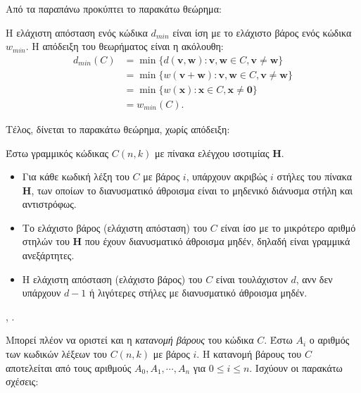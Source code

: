 Από τα παραπάνω προκύπτει το παρακάτω θεώρημα:

\begin{theorem}
Η ελάχιστη απόσταση ενός κώδικα $d_{min}$ είναι ίση με το ελάχιστο βάρος ενός κώδικα $w_{min}$. Η απόδειξη του θεωρήματος είναι η ακόλουθη:
\begin{equation}
\begin{split}
d_{min}(C) & = \min \lbrace d \left( \mathbf{v},\mathbf{w} \right) : \mathbf{v},\mathbf{w} \in C, \mathbf{v}\neq\mathbf{w} \rbrace \\
& = \min \lbrace w \left( \mathbf{v}+\mathbf{w} \right) : \mathbf{v},\mathbf{w} \in C, \mathbf{v}\neq\mathbf{w} \rbrace \\
& = \min \lbrace w \left( \mathbf{x} \right) : \mathbf{x} \in C, \mathbf{x}\neq\mathbf{0} \rbrace \\
& = w_{min}(C).
\end{split}
\end{equation}
\label{theorem:min distance}
\end{theorem}

Τέλος, δίνεται το παρακάτω θεώρημα, χωρίς απόδειξη:

\begin{theorem}
Έστω γραμμικός  κώδικας $C(n,k)$ με πίνακα ελέγχου ισοτιμίας $\mathbf{H}$.
\begin{itemize}
\item Για κάθε κωδική λέξη του $C$ με βάρος $i$, υπάρχουν ακριβώς $i$ στήλες του πίνακα $\mathbf{H}$, των οποίων το διανυσματικό άθροισμα είναι το μηδενικό διάνυσμα στήλη και αντιστρόφως.
\item Το ελάχιστο βάρος (ελάχιστη απόσταση) του $C$ είναι ίσο με το μικρότερο αριθμό στηλών του $\mathbf{H}$ που έχουν διανυσματικό άθροισμα μηδέν, δηλαδή είναι γραμμικά ανεξάρτητες.
\item Η ελάχιστη απόσταση (ελάχιστο βάρος) του $C$ είναι τουλάχιστον $d$, ανν δεν υπάρχουν $d-1$ ή λιγότερες στήλες με διανυσματικό άθροισμα μηδέν.
\end{itemize}
\label{theorem:distance weight parity check matrix}
\end{theorem}
\cite{ryan2009channel}, \cite{peterson1972error}.

\vspace{3mm}
Μπορεί πλέον να οριστεί και η \textit{κατανομή βάρους} του κώδικα $C$. Έστω $A_i$ ο αριθμός των κωδικών λέξεων του $C(n,k)$ με βάρος  $i$. Η κατανομή βάρους του $C$ αποτελείται από τους αριθμούς $A_0,A_1,\cdots,A_n$ για $0\leq i \leq n$. Ισχύουν οι παρακάτω σχέσεις:

